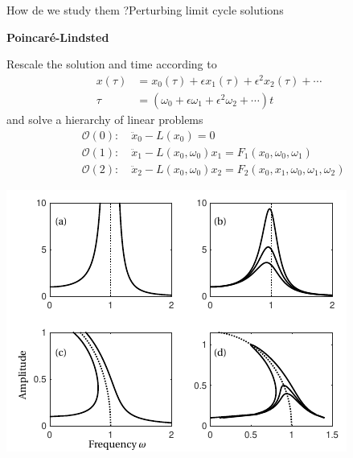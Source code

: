 \documentclass[usenames,dvipsnames,svgnames,10pt,aspectratio=169]{beamer}
\begin{document}
\begin{frame}[t, c]{How de we study them ?}{Perturbing limit cycle solutions}
  \begin{minipage}{.48\textwidth}
    \centering
    \textbf{Poincaré-Lindsted}

    \medskip

    Rescale the solution and time according to
    \[
    \begin{aligned}
      x(\tau) & = x_0(\tau) + \epsilon x_1(\tau) + \epsilon^2 x_2(\tau) + \cdots \\
      \tau & = \left(\omega_0 + \epsilon \omega_1 + \epsilon^2 \omega_2 + \cdots \right) t
    \end{aligned}
    \]
    and solve a hierarchy of linear problems
    \[
    \begin{aligned}
      & \mathcal{O}(0) : \quad \ddot{x}_0 - L(x_0) = 0\\
      & \mathcal{O}(1) : \quad \ddot{x}_1 - L(x_0, \omega_0)x_1 = F_1(x_0, \omega_0, \omega_1) \\
      & \mathcal{O}(2) : \quad \ddot{x}_2 - L(x_0, \omega_0)x_2 = F_2(x_0, x_1, \omega_0, \omega_1, \omega_2)
    \end{aligned}
    \]
  \end{minipage}%
  \hfill
  \begin{minipage}{.48\textwidth}
    \centering
    \includegraphics[width=\textwidth]{poincare_lindsted}
  \end{minipage}

  \vspace{1cm}
\end{frame}
\end{document}
